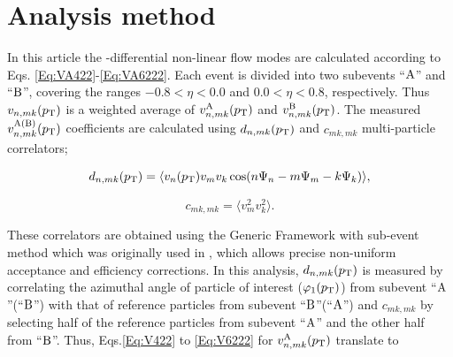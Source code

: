 \section{Analysis method}
\label{Sec:Analysis method}
In this article the \pT-differential non-linear flow modes are calculated according to Eqs. \ref{Eq:VA422}-\ref{Eq:VA6222}. Each event is divided into two subevents ``$\rm{A}$'' and ``$\rm{B}$'', covering the ranges $-0.8< \eta < 0.0$ and $0.0 <\eta< 0.8$, respectively. Thus $v_{n,mk}(p_{\rm{T}})$ is a weighted average of $v_{n,mk}^{\rm{A}}(p_{\rm{T}})$ and $v_{n,mk}^{\rm{B}}(p_{\rm{T}})$. The measured $v_{n,mk}^{\rm{A(B)}}(p_{\rm{T}})$ coefficients are calculated using $d_{n,mk}(p_{\rm{T}})$ and $c_{mk,mk}$ multi-particle correlators;

\begin{equation}
d_{n,mk}(p_{\rm{T}}) = \langle v_{n}(p_{\rm{T}})v_{m}v_{k}\cos(n\Psi_{n}-m\Psi_{m}-k\Psi_{k}) \rangle,
\label{Eq:dnmki}
\end{equation}


\begin{equation}
c_{mk,mk} = \langle v_{m}^{2}v_{k}^{2}\rangle.
\label{Eq:cmkimki}
\end{equation}

 
These correlators are obtained using the Generic Framework with sub-event method which was originally used in \cite{Acharya:2017zfg}, which allows precise non-uniform acceptance and efficiency corrections. In this analysis, $d_{n,mk}(p_{\rm{T}})$ is measured by correlating the azimuthal angle of particle of interest ($\varphi_{1}(p_{\rm T})$) from subevent ``$\rm{A}$''(``$\rm{B}$'') with that of reference particles from subevent ``$\rm{B}$''(``$\rm{A}$'') and $c_{mk,mk}$ by selecting half of the reference particles from subevent ``$\rm{A}$'' and the other half from ``$\rm{B}$''. Thus, Eqs.\ref{Eq:V422} to \ref{Eq:V6222} for $v_{n,mk}^{\rm{A}}(p_{\rm{T}})$ translate to

